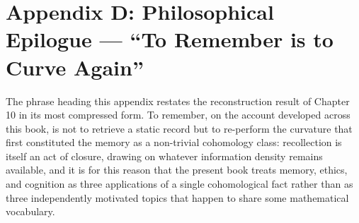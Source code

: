 \chapter*{Appendix D: Philosophical Epilogue --- ``To Remember is to Curve Again''}

The phrase heading this appendix restates the reconstruction result of Chapter 10 in its most compressed form. To remember, on the account developed across this book, is not to retrieve a static record but to re-perform the curvature that first constituted the memory as a non-trivial cohomology class: recollection is itself an act of closure, drawing on whatever information density remains available, and it is for this reason that the present book treats memory, ethics, and cognition as three applications of a single cohomological fact rather than as three independently motivated topics that happen to share some mathematical vocabulary.
